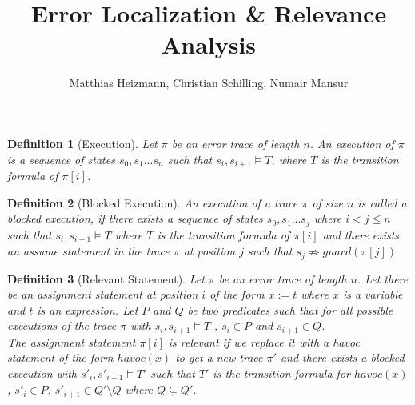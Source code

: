 \documentclass{article}
\title{Error Localization \& Relevance Analysis \\ }
\author{Matthias Heizmann, Christian Schilling, Numair Mansur}
\affil{University of Freiburg, Germany}
\date{\vspace{-5ex}}
\newcommand{\limp}{\Rightarrow}
\newtheorem{mydef}{Definition}
\begin{document}
\begin{mydef}[Execution]\label{mydef:execution}
Let $\pi$ be an error trace of length $n$. An execution of $\pi$ is a sequence of states $s_0, s_1 ... s_n$ such that $s_i, s_{i+1} \vDash T$, where $T$ is the transition formula of $\pi[i]$.
\end{mydef}
\begin{mydef}[Blocked Execution]\label{mydef:blocked_execution}
An execution of a trace $\pi$ of size $n$ is called a blocked execution, if there exists a sequence of states $s_0,s_1...s_j$ where $i<j \leq n$ such that $s_i, s_{i+1} \vDash T$ where $T$ is the transition formula of $\pi[i]$ and there exists an assume statement in the trace $\pi$ at position $j$ such that $s_j \not \limp guard(\pi[j])$
\end{mydef}

\begin{mydef}[Relevant Statement]\label{mydef:responsible}
Let $\pi$ be an error trace of length $n$. Let there be an assignment statement at position $i$ of the form $x:=t$ where $x$ is a variable and $t$ is an expression. Let $P$ and $Q$ be two predicates such that for all possible executions of the trace $\pi$ with $s_i,s_{i+1} \vDash T$ , $s_i \in P$ and $s_{i+1} \in Q$.\\
The assignment statement $\pi[i]$ is relevant if we replace it with a havoc statement of the form $havoc(x)$ to get a new trace $\pi'$ and there exists a blocked execution with $s'_i,s'_{i+1} \vDash T'$ such that $T'$ is the transition formula for $havoc(x)$, $s'_i \in P$, $s'_{i+1} \in Q' \setminus Q$ where $Q \subsetneq Q'$.
\end{mydef}
\end{document}

